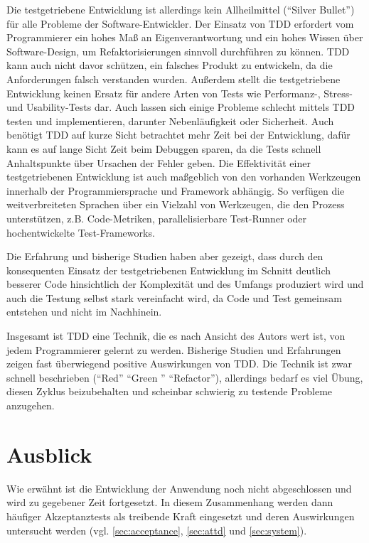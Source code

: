 Die testgetriebene Entwicklung ist allerdings kein Allheilmittel ("`Silver Bullet"') für alle Probleme der Software-Entwickler. Der Einsatz von TDD erfordert vom Programmierer ein hohes Maß an Eigenverantwortung und ein hohes Wissen über Software-Design, um Refaktorisierungen sinnvoll durchführen zu können. TDD kann auch nicht davor schützen, ein falsches Produkt zu entwickeln, da die Anforderungen falsch verstanden wurden. Außerdem stellt die testgetriebene Entwicklung keinen Ersatz für andere Arten von Tests wie Performanz-, Stress- und Usability-Tests dar. Auch lassen sich einige Probleme schlecht mittels TDD testen und implementieren, darunter Nebenläufigkeit oder Sicherheit. Auch benötigt TDD auf kurze Sicht betrachtet mehr Zeit bei der Entwicklung, dafür kann es auf lange Sicht Zeit beim Debuggen sparen, da die Tests schnell Anhaltspunkte über Ursachen der Fehler geben.
Die Effektivität einer testgetriebenen Entwicklung ist auch maßgeblich von den vorhanden Werkzeugen innerhalb der Programmiersprache und Framework abhängig. So verfügen die weitverbreiteten Sprachen über ein Vielzahl von Werkzeugen, die den Prozess unterstützen, z.B. Code-Metriken, parallelisierbare Test-Runner oder hochentwickelte Test-Frameworks.

Die Erfahrung und bisherige Studien haben aber gezeigt, dass durch den konsequenten Einsatz der testgetriebenen Entwicklung im Schnitt deutlich besserer Code hinsichtlich der Komplexität und des Umfangs produziert wird und auch die Testung selbst stark vereinfacht wird, da Code und Test gemeinsam entstehen und nicht im Nachhinein.

Insgesamt ist TDD eine Technik, die es nach Ansicht des Autors wert ist, von jedem Programmierer gelernt zu werden. Bisherige Studien und Erfahrungen zeigen fast überwiegend positive Auswirkungen von TDD. Die Technik ist zwar schnell beschrieben ("`Red"' "`Green "' "`Refactor"'), allerdings bedarf es viel Übung, diesen Zyklus beizubehalten und scheinbar schwierig zu testende Probleme anzugehen.

\section{Ausblick}
Wie erwähnt ist die Entwicklung der Anwendung noch nicht abgeschlossen und wird zu gegebener Zeit fortgesetzt. In diesem Zusammenhang werden dann häufiger Akzeptanztests als treibende Kraft eingesetzt und deren Auswirkungen untersucht werden (vgl. \ref{sec:acceptance}, \ref{sec:attd} und \ref{sec:system}).

